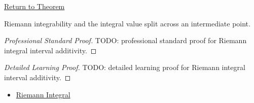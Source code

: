 \newpage
{}
\label{prf:riemann-integral-interval-additivity}

\begin{remark*}[Return]
\hyperref[thm:riemann-integral-interval-additivity]{Return to Theorem}
\end{remark*}

\begin{theorem*}
Riemann integrability and the integral value split across an intermediate
point.
\end{theorem*}

\begin{proof}[Professional Standard Proof]
\LRAProofBodyStart
TODO: professional standard proof for Riemann integral interval additivity.
\end{proof}

\begin{proof}[Detailed Learning Proof]
\LRAProofBodyStart
TODO: detailed learning proof for Riemann integral interval additivity.
\end{proof}

\begin{remark*}
\end{remark*}

\begin{dependencies}
\begin{itemize}
  \item \hyperref[def:riemann-integral]{Riemann Integral}
\end{itemize}
\end{dependencies}

\clearpage
